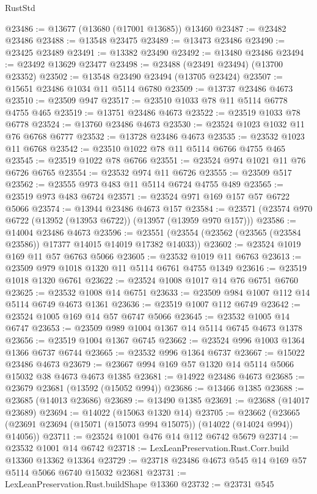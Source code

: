 \begin{lexlean}{RustStd}
\begin{coremodule}
@23486 := @13677 (@13680 (@17001 @13685)) @13460
@23487 := @23482 @23486
@23488 := @13548 @23475
@23489 := @13473 @23486
@23490 := @23425 @23489
@23491 := @13382 @23490
@23492 := @13480 @23486
@23494 := @23492 @13629 @23477
@23498 := @23488 (@23491 @23494) (@13700 @23352)
@23502 := @13548 @23490 @23494 (@13705 @23424)
@23507 := @15651 @23486 @1034 @11 @5114 @6780
@23509 := @13737 @23486 @4673
@23510 := @23509 @947
@23517 := @23510 @1033 @78 @11 @5114 @6778 @4755 @465
@23519 := @13751 @23486 @4673
@23522 := @23519 @1033 @78 @6778
@23524 := @13760 @23486 @4673
@23530 := @23524 @1023 @1032 @11 @76 @6768 @6777
@23532 := @13728 @23486 @4673
@23535 := @23532 @1023 @11 @6768
@23542 := @23510 @1022 @78 @11 @5114 @6766 @4755 @465
@23545 := @23519 @1022 @78 @6766
@23551 := @23524 @974 @1021 @11 @76 @6726 @6765
@23554 := @23532 @974 @11 @6726
@23555 := @23509 @517
@23562 := @23555 @973 @483 @11 @5114 @6724 @4755 @489
@23565 := @23519 @973 @483 @6724
@23571 := @23524 @971 @169 @157 @57 @6722 @5066
@23574 := @13944 @23486 @4673 @157
@23584 := @23571 (@23574 @970 @6722 (@13952 (@13953 @6722)) (@13957 (@13959 @970 @157)))
@23586 := @14004 @23486 @4673
@23596 := @23551 (@23554 (@23562 (@23565 (@23584 @23586)) @17377 @14015 @14019 @17382 @14033))
@23602 := @23524 @1019 @169 @11 @57 @6763 @5066
@23605 := @23532 @1019 @11 @6763
@23613 := @23509 @979 @1018 @1320 @11 @5114 @6761 @4755 @1349
@23616 := @23519 @1018 @1320 @6761
@23622 := @23524 @1008 @1017 @14 @76 @6751 @6760
@23625 := @23532 @1008 @14 @6751
@23633 := @23509 @984 @1007 @112 @14 @5114 @6749 @4673 @1361
@23636 := @23519 @1007 @112 @6749
@23642 := @23524 @1005 @169 @14 @57 @6747 @5066
@23645 := @23532 @1005 @14 @6747
@23653 := @23509 @989 @1004 @1367 @14 @5114 @6745 @4673 @1378
@23656 := @23519 @1004 @1367 @6745
@23662 := @23524 @996 @1003 @1364 @1366 @6737 @6744
@23665 := @23532 @996 @1364 @6737
@23667 := @15022 @23486 @4673
@23679 := @23667 @994 @169 @57 @1320 @14 @5114 @5066 @15032 @38 @4673 @4673 @1385
@23681 := @14922 @23486 @4673
@23685 := @23679 @23681 (@13592 (@15052 @994))
@23686 := @13466 @1385
@23688 := @23685 (@14013 @23686)
@23689 := @13490 @1385
@23691 := @23688 (@14017 @23689)
@23694 := @14022 (@15063 @1320 @14)
@23705 := @23662
    (@23665 (@23691 @23694 (@15071 (@15073 @994 @15075)) (@14022 (@14024 @994)) @14056))
@23711 := @23524 @1001 @476 @14 @112 @6742 @5679
@23714 := @23532 @1001 @14 @6742
@23718 := LexLeanPreservation.Rust.Corr.build @13360 @13362 @13364
@23729 := @23718 @23486 @4673 @545 @14 @169 @57 @5114 @5066 @6740 @15032 @23681
@23731 := LexLeanPreservation.Rust.buildShape @13360
@23732 := @23731 @545

\end{coremodule}
\end{lexlean}
